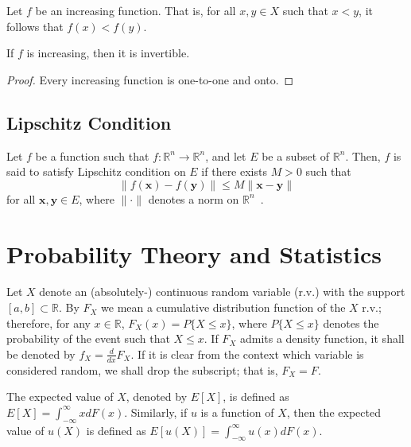 Let $f$ be an increasing function. That is, for all $x,y\in X$ such that $x < y$, it follows that $f(x) < f(y)$.
\begin{corollary}
\label{cor:increasing_invertible_notation}
If $f$ is increasing, then it is invertible.
\end{corollary}
\begin{proof}
Every increasing function is one-to-one and onto.
\end{proof}

\subsection{Lipschitz Condition} %
\label{sub:lipschitz_condition_notation}
Let $f$ be a function such that $f: \mathbb{R}^n \to \mathbb{R}^n$, and let $E$ be a subset of $\mathbb{R}^n$. Then, $f$ is said to satisfy Lipschitz condition on $E$ if there exists $M>0$ such that
\begin{equation*}
	\|f(\mathbf{x}) - f(\mathbf{y})\| \leq M \| \mathbf{x} - \mathbf{y} \|
\end{equation*}
for all $\mathbf{x},\mathbf{y}\in E$, where $\|\cdot\|$ denotes a norm on $\mathbb{R}^n$~\cite{HubbardPaarsch2011,SteinShakarchiCH7}.

\section{Probability Theory and Statistics} %
\label{sec:probability_notation}
Let $X$ denote an (absolutely-) continuous random variable (r.v.) with the support $[a, b]\subset\mathbb{R}$. By $F_{X}$ we mean a cumulative distribution function of the $X$ r.v.; therefore, for any $x\in\mathbb{R}$, $F_{X}(x) = P\{X \le x\}$, where $P\{X\le x\}$ denotes the probability of the event such that $X\le x$. If $F_{X}$ admits a density function, it shall be denoted by $f_{X} = \frac{d}{dx}F_{X}$. If it is clear from the context which variable is considered random, we shall drop the subscript; that is, $F_{X}= F$.

The expected value of $X$, denoted by $E[X]$, is defined as $E[X] = \int_{-\infty}^{\infty} xdF(x)$. Similarly, if $u$ is a function of $X$, then the expected value of $u(X)$ is defined as $E[u(X)] = \int_{-\infty}^{\infty} u(x)dF(x)$.

